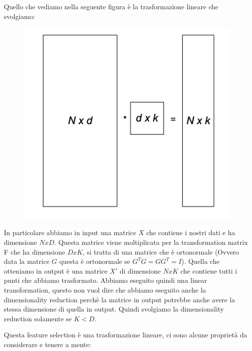\documentclass[14pt]{extreport}
\begin{document}
Quello che vediamo nella seguente figura è la trasformazione lineare che svolgiamo:

\begin{figure}[H]
	\centering
	\includegraphics[width=0.7\linewidth]{439.jpeg}
	\end{figure}

In particolare abbiamo in input una matrice $X$ che contiene i nostri dati e ha dimensione $NxD$. 
Questa matrice viene moltiplicata per la transformation matrix F che ha dimensione $DxK$, si tratta di una matrice che è ortonormale
(Ovvero data la matrice $G$ questa è ortonormale se $G^TG=GG^T=I$).
Quella che otteniamo in output è una matrice $X'$ di dimensione $NxK$ che contiene tutti i punti che abbiamo trasformato.
Abbiamo eseguito quindi una linear transformation, questo 
non vuol dire che abbiamo eseguito anche la dimensionality reduction perchè la matrice in output potrebbe anche avere la stessa 
dimensione di quella in output. Quindi svolgiamo la dimensionality reduction solamente se $K<D$.

Questa feature selection è una trasformazione lineare, ci sono alcune proprietà da considerare e tenere a mente:
\end{document}
